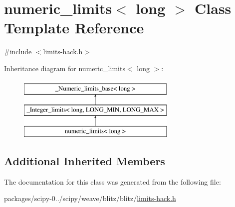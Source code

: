 \hypertarget{classnumeric__limits_3_01long_01_4}{}\section{numeric\+\_\+limits$<$ long $>$ Class Template Reference}
\label{classnumeric__limits_3_01long_01_4}


{\ttfamily \#include $<$limits-\/hack.\+h$>$}

Inheritance diagram for numeric\+\_\+limits$<$ long $>$\+:\begin{figure}[H]
\begin{center}
\leavevmode
\includegraphics[height=3.000000cm]{classnumeric__limits_3_01long_01_4}
\end{center}
\end{figure}
\subsection*{Additional Inherited Members}


The documentation for this class was generated from the following file\+:\begin{DoxyCompactItemize}
\item 
packages/scipy-\/0../scipy/weave/blitz/blitz/\hyperlink{limits-hack_8h}{limits-\/hack.\+h}\end{DoxyCompactItemize}

